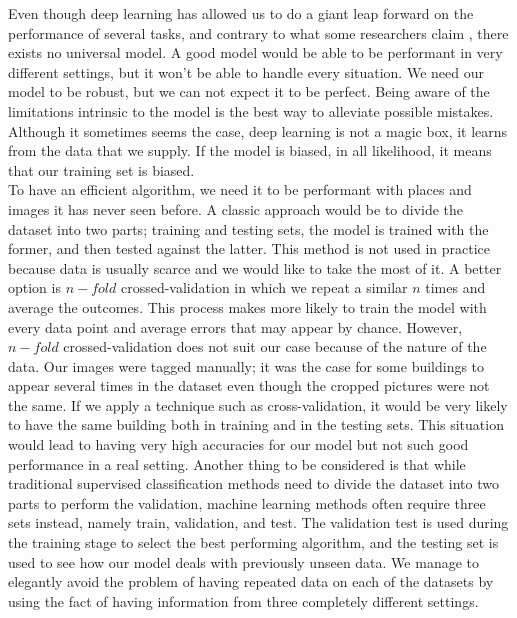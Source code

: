 Even though deep learning has allowed us to do a giant leap forward on the performance of several tasks, and contrary to what some researchers claim \cite{DBLP:journals/corr/KaiserGSVPJU17}, there exists no universal model. A good model would be able to be performant in very different settings, but it won't be able to handle every situation. We need our model to be robust, but we can not expect it to be perfect. Being aware of the limitations intrinsic to the model is the best way to alleviate possible mistakes. Although it sometimes seems the case, deep learning is not a magic box, it learns from the data that we supply. If the model is biased, in all likelihood, it means that our training set is biased.\\

To have an efficient algorithm, we need it to be performant with places and images it has never seen before. A classic approach would be to divide the dataset into two parts; training and testing sets, the model is trained with the former, and then tested against the latter. This method is not used in practice because data is usually scarce and we would like to take the most of it. A better option is $n-fold$ crossed-validation in which we repeat a similar $n$ times and average the outcomes. This process makes more likely to train the model with every data point and average errors that may appear by chance. However, $n-fold$ crossed-validation does not suit our case because of the nature of the data. Our images were tagged manually; it was the case for some buildings to appear several times in the dataset even though the cropped pictures were not the same. If we apply a technique such as cross-validation, it would be very likely to have the same building both in training and in the testing sets. This situation would lead to having very high accuracies for our model but not such good performance in a real setting. Another thing to be considered is that while traditional supervised classification methods need to divide the dataset into two parts to perform the validation, machine learning methods often require three sets instead, namely train, validation,  and test. The validation test is used during the training stage to select the best performing algorithm, and the testing set is used to see how our model deals with previously unseen data. We manage to elegantly avoid the problem of having repeated data on each of the datasets by using the fact of having information from three completely different settings.\\

